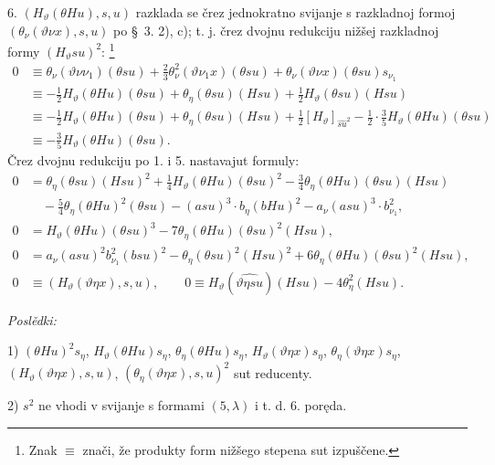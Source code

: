 \documentclass[11pt]{article}
\begin{document}
6. $(H_\vartheta(\theta Hu),s,u)$ razklada se črez jednokratno svijanje s razkladnoj formoj $(\theta_{\nu}(\vartheta\nu x),s,u)$ po \S\ 3. 2), c); t. j. črez dvojnu redukciju nižšej razkladnoj formy $(H_\vartheta su)^2$: \footnote{Znak $\equiv$ znači, že produkty form nižšego stepena sut izpuščene.}
\[
\begin{aligned}
0&\equiv \theta_{\nu}(\vartheta\nu\nu_1)(\theta su)+\frac23\theta_{\nu}^2(\vartheta\nu_1x)(\theta su)+\theta_{\nu}(\vartheta\nu x)(\theta su)s_{\nu_1}\\
&\equiv -\frac12H_\vartheta(\theta Hu)(\theta su)+\theta_\eta(\theta su)(Hsu)+\frac12H_\vartheta(\theta su)(Hsu)\\
&\equiv -\frac12H_\vartheta(\theta Hu)(\theta su)+\theta_\eta(\theta su)(Hsu)+\frac12[H_\vartheta]_{\widehat{su}^2}-\frac12\cdot\frac35H_\vartheta(\theta Hu)(\theta su)\\
&\equiv -\frac35H_\vartheta(\theta Hu)(\theta su).
\end{aligned}
\]
Črez dvojnu redukciju po 1. i 5. nastavajut formuly:
\enlargethispage{\baselineskip}
\begin{align*}
0&=\theta_\eta(\theta su)(Hsu)^2+\frac14H_\vartheta(\theta Hu)(\theta su)^2-\frac34\theta_\eta(\theta Hu)(\theta su)(Hsu)\\
&\quad-\frac54\theta_\eta(\theta Hu)^2(\theta su)-(asu)^3\cdot b_\eta(bHu)^2-a_{\nu}(asu)^3\cdot b_{\nu_1}^2,\\
0&=H_\vartheta(\theta Hu)(\theta su)^3-7\theta_\eta(\theta Hu)(\theta su)^2(Hsu),\tag{31}\\
0&=a_{\nu}(asu)^2b_{\nu_1}^{2}(bsu)^2-\theta_\eta(\theta su)^2(Hsu)^2+6\theta_\eta(\theta Hu)(\theta su)^2(Hsu),\\
0&\equiv (H_\vartheta(\vartheta\eta x),s,u),\qquad
0\equiv H_\vartheta(\widehat{\vartheta\eta su})(Hsu)-4\theta_\eta^2(Hsu).
\end{align*}

\noindent\textit{Poslědki:}

1) $(\theta Hu)^2s_\eta$, $H_\vartheta(\theta Hu)s_\eta$, $\theta_\eta(\theta Hu)s_\eta$, $H_\vartheta(\vartheta\eta x)s_\eta$, $\theta_\eta(\vartheta\eta x)s_\eta$, $(H_\vartheta(\vartheta\eta x),s,u)$, $(\theta_\eta(\vartheta\eta x),s,u)^2$ sut reducenty.

2) $s^2$ ne vhodi v svijanje s formami $(5,\lambda)$ i t. d. 6. poręda.
\end{document}
